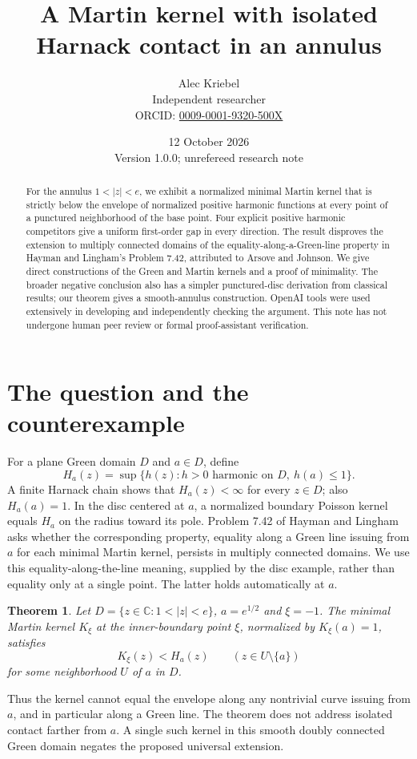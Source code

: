 \documentclass[11pt]{article}
\title{A Martin kernel with isolated Harnack contact in an annulus}
\author{Alec Kriebel\\\small Independent researcher\\
\small ORCID: \href{https://orcid.org/0009-0001-9320-500X}{0009-0001-9320-500X}}
\date{12 October 2026\\\small Version 1.0.0; unrefereed research note}
\newtheorem{theorem}{Theorem}
\begin{document}
\maketitle
\begin{abstract}
For the annulus $1<|z|<e$, we exhibit a normalized minimal Martin kernel that is strictly below the envelope of normalized positive harmonic functions at every point of a punctured neighborhood of the base point. Four explicit positive harmonic competitors give a uniform first-order gap in every direction. The result disproves the extension to multiply connected domains of the equality-along-a-Green-line property in Hayman and Lingham's Problem 7.42, attributed to Arsove and Johnson. We give direct constructions of the Green and Martin kernels and a proof of minimality. The broader negative conclusion also has a simpler punctured-disc derivation from classical results; our theorem gives a smooth-annulus construction. OpenAI tools were used extensively in developing and independently checking the argument. This note has not undergone human peer review or formal proof-assistant verification.
\end{abstract}

\section{The question and the counterexample}
For a plane Green domain $D$ and $a\in D$, define
\[
 H_a(z)=\sup\{h(z):h>0\text{ harmonic on }D,\ h(a)\leq1\}.
\]
A finite Harnack chain shows that $H_a(z)<\infty$ for every $z\in D$; also $H_a(a)=1$. In the disc centered at $a$, a normalized boundary Poisson kernel equals $H_a$ on the radius toward its pole. Problem 7.42 of Hayman and Lingham~\cite{HL} asks whether the corresponding property, equality along a Green line issuing from $a$ for each minimal Martin kernel, persists in multiply connected domains. We use this equality-along-the-line meaning, supplied by the disc example, rather than equality only at a single point. The latter holds automatically at $a$.

\begin{theorem}\label{thm:main}
Let $D=\{z\in\mathbb C:1<|z|<e\}$, $a=e^{1/2}$ and $\xi=-1$. The minimal Martin kernel $K_\xi$ at the inner-boundary point $\xi$, normalized by $K_\xi(a)=1$, satisfies
\[
 K_\xi(z)<H_a(z)\qquad(z\in U\setminus\{a\})
\]
for some neighborhood $U$ of $a$ in $D$.
\end{theorem}

Thus the kernel cannot equal the envelope along any nontrivial curve issuing from $a$, and in particular along a Green line. The theorem does not address isolated contact farther from $a$. A single such kernel in this smooth doubly connected Green domain negates the proposed universal extension.
\end{document}
